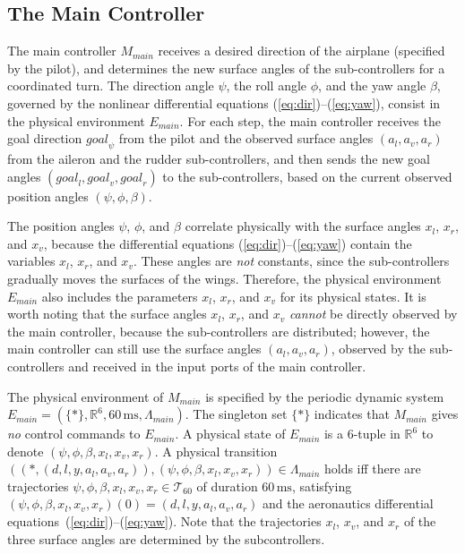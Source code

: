 \documentclass{sig-alternate}
\begin{document}
\subsection{The Main Controller}

The main controller $M_\mathit{main}$ receives 
a desired direction of the airplane (specified by the pilot),
and determines the new surface angles of the sub-controllers
for a coordinated turn. 
%
The direction angle $\psi$, the roll angle $\phi$, and the yaw angle $\beta$,
governed by the nonlinear differential equations (\ref{eq:dir})--(\ref{eq:yaw}),
consist in the physical environment $E_\mathit{main}$.
For each step, the main controller receives the goal direction
$\mathit{goal}_\psi$ from the pilot 
and the observed surface angles $(a_l, a_v, a_r)$
from the aileron and the rudder sub-controllers,
and then sends the new goal angles 
$(\mathit{goal}_l, \mathit{goal}_v, \mathit{goal}_r)$ to the sub-controllers,
based on the current observed position angles $(\psi, \phi, \beta)$.


The position angles $\psi$, $\phi$, and $\beta$ correlate
physically with the surface angles $x_l$, $x_r$, and $x_v$,
because the differential equations (\ref{eq:dir})--(\ref{eq:yaw}) contain 
the variables $x_l$, $x_r$, and $x_v$.
These angles are \emph{not} constants,
since the sub-controllers gradually  moves the surfaces of the wings.
Therefore, the physical environment $E_\mathit{main}$
also includes the parameters $x_l$, $x_r$, and $x_v$
for its physical states.
It is worth noting that the surface angles $x_l$, $x_r$, and $x_v$
\emph{cannot} be directly observed by the main controller, 
because the sub-controllers are distributed;
however, the main controller can still use the surface angles $(a_l, a_v, a_r)$,
observed by the sub-controllers and received in the input ports of the main controller.
 
The physical environment of $M_\mathit{main}$
is specified by the periodic dynamic system
$E_\mathit{main} = (\{\ast\}, \mathbb{R}^6, 60\,\mathrm{ms}, \Lambda_{\mathit{main}})$.
The singleton set $\{\ast\}$ indicates 
that $M_\mathit{main}$ gives \emph{no} control commands to $E_\mathit{main}$.
A physical state of $E_\mathit{main}$
is a $6$-tuple in $\mathbb{R}^6$ 
to denote $(\psi,  \phi, \beta, x_l, x_v, x_r)$.
A physical transition
$((\ast, (d,  l, y, a_l, a_v, a_r)), (\psi,  \phi, \beta, x_l, x_v, x_r)) \in \Lambda_{\mathit{main}}$
holds
iff there are trajectories $\psi,  \phi, \beta, x_l, x_v, x_r \in \mathcal{T}_{60}$
of duration $60\,\mathrm{ms}$,
satisfying 
$(\psi,  \phi, \beta, x_l, x_v, x_r)(0) = (d,  l, y, a_l, a_v, a_r)$
and
the aeronautics 
differential equations~(\ref{eq:dir})--(\ref{eq:yaw}). 
Note that 
the trajectories $x_l$, $x_v$, and $x_r$ of the three surface angles 
are determined by the subcontrollers.
\end{document}
